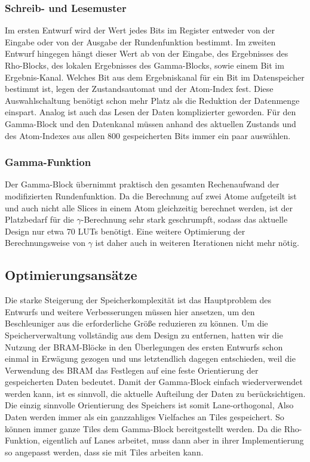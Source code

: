 \subsubsection{Schreib- und Lesemuster}
Im ersten Entwurf wird der Wert jedes Bits im Register entweder von der Eingabe oder von der Ausgabe der Rundenfunktion bestimmt.
Im zweiten Entwurf hingegen hängt dieser Wert ab von der Eingabe, des Ergebnisses des Rho-Blocks, des lokalen Ergebnisses des Gamma-Blocks, sowie einem Bit im Ergebnis-Kanal.
Welches Bit aus dem Ergebniskanal für ein Bit im Datenspeicher bestimmt ist, legen der Zustandsautomat und der Atom-Index fest.
Diese Auswahlschaltung benötigt schon mehr Platz als die Reduktion der Datenmenge einspart.
Analog ist auch das Lesen der Daten komplizierter geworden. Für den Gamma-Block und den Datenkanal müssen
anhand des aktuellen Zustands und des Atom-Indexes aus allen 800 gespeicherten Bits immer ein paar auswählen.

\subsubsection{Gamma-Funktion}
Der Gamma-Block übernimmt praktisch den gesamten Rechenaufwand der modifizierten Rundenfunktion. Da die Berechnung auf
zwei Atome aufgeteilt ist und auch nicht alle Slices in einem Atom gleichzeitig berechnet werden, ist der Platzbedarf für
die $\gamma$-Berechnung sehr stark geschrumpft, sodass das aktuelle Design nur etwa 70 LUTs benötigt.
Eine weitere Optimierung der Berechnungsweise von $\gamma$ ist daher auch in weiteren Iterationen nicht mehr nötig.

\subsection{Optimierungsansätze}
Die starke Steigerung der Speicherkomplexität ist das Hauptproblem des Entwurfs und weitere Verbesserungen müssen hier ansetzen,
um den Beschleuniger aus die erforderliche Größe reduzieren zu können. Um die Speicherverwaltung vollständig aus dem Design zu entfernen,
hatten wir die Nutzung der BRAM-Blöcke in den Überlegungen des ersten Entwurfs schon einmal in Erwägung gezogen und uns letztendlich dagegen entschieden,
weil die Verwendung des BRAM das Festlegen auf eine feste Orientierung der gespeicherten Daten bedeutet. Damit der Gamma-Block einfach wiederverwendet werden kann,
ist es sinnvoll, die aktuelle Aufteilung der Daten zu berücksichtigen. Die einzig sinnvolle Orientierung des Speichers ist somit Lane-orthogonal,
Also Daten werden immer als ein ganzzahliges Vielfaches an Tiles gespeichert. So können immer ganze Tiles dem Gamma-Block bereitgestellt werden.
Da die Rho-Funktion, eigentlich auf Lanes arbeitet, muss dann aber in ihrer Implementierung so angepasst werden, dass sie mit Tiles arbeiten kann.

